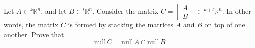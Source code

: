 \documentclass[10pt]{exam}
\newcommand{\tb}{\textbf}
\newcommand{\noin}{\noindent}
\begin{document}
\vspace{0.2in}
{\large
{}

\vspace{0.2in}


}

\vfill


\pagebreak


\noin {\tb 1.}  Let $A\in {^k}\mathbb R^n$, and let $B\in {^l}\mathbb R^n$.  Consider the matrix $C=\begin{bmatrix} A\\ B \end{bmatrix} \in {^{k+l}}\mathbb R^n$.  In other words, the matrix $C$ is formed by stacking the matrices $A$ and $B$ on top of one another.   Prove that
$$\mathrm{null}\, C = \mathrm{null}\, A \cap \mathrm{null}\, B$$
\end{document}
